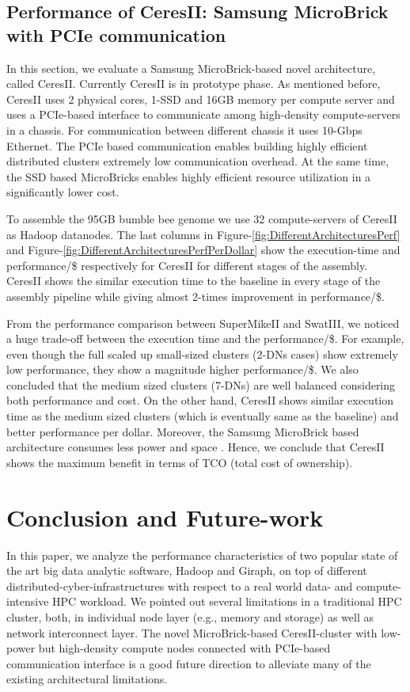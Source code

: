 \documentclass[conference]{IEEEtran}
\begin{document}
\subsection {Performance of CeresII: Samsung MicroBrick with PCIe communication} \label{CeresII:Scaledout-in-a-boxAndSSD}
In this section, we evaluate a Samsung MicroBrick-based novel architecture, called CeresII. Currently CeresII is in prototype phase. As mentioned before, CeresII uses 2 physical cores, 1-SSD and 16GB memory per compute server and uses a PCIe-based interface to communicate among high-density compute-servers in a chassis. For communication between different chassis it uses 10-Gbps Ethernet. The PCIe based communication enables building highly efficient distributed clusters extremely low communication overhead. At the same time, the SSD based MicroBricks enables highly efficient resource utilization in a significantly lower cost. 

To assemble the 95GB bumble bee genome we use 32 compute-servers of CeresII as Hadoop datanodes. The last columns in Figure-\ref{fig:DifferentArchitecturesPerf} and Figure-\ref{fig:DifferentArchitecturesPerfPerDollar} show the execution-time and performance/\$ respectively for CeresII for different stages of the assembly. CeresII shows the similar execution time to the baseline in every stage of the assembly pipeline while giving almost 2-times improvement in performance/\$.

From the performance comparison between SuperMikeII and SwatIII, we noticed a huge trade-off between the execution time and the performance/\$. For example, even though the full scaled up small-sized clusters (2-DNs cases) show extremely low performance, they show a magnitude higher performance/\$. We also concluded that the medium sized clusters (7-DNs) are well balanced considering both performance and cost. On the other hand, CeresII shows similar execution time as the medium sized clusters (which is eventually same as the baseline) and better performance per dollar. Moreover, the Samsung MicroBrick based architecture consumes less power and space \cite{Cluster:ceres1}. Hence, we conclude that CeresII shows the maximum benefit in terms of TCO (total cost of ownership).

\section {Conclusion and Future-work} \label{conclusion}
In this paper, we analyze the performance characteristics of two popular state of the art big data analytic software, Hadoop and Giraph, on top of different distributed-cyber-infrastructures with respect to a real world data- and compute-intensive HPC workload. We pointed out several limitations in a traditional HPC cluster, both, in individual node layer (e.g., memory and storage) as well as network interconnect layer. The novel MicroBrick-based CeresII-cluster with low-power but high-density compute nodes connected with PCIe-based communication interface is a good future direction to alleviate many of the existing architectural limitations.
\end{document}
